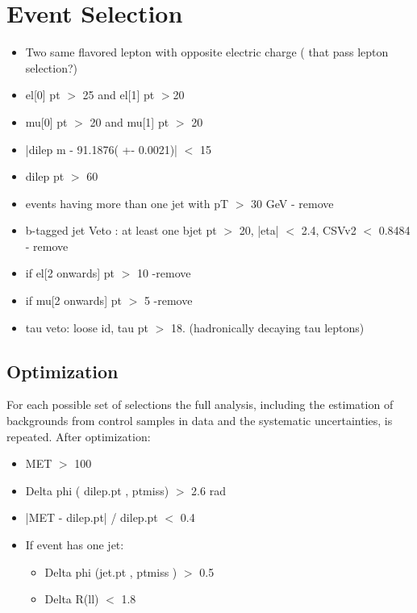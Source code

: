 \documentclass[12pt,A4paper]{article}
\begin{document}
\section{Event Selection}

\begin{itemize}
\item
    Two same flavored lepton with opposite electric charge ( that pass lepton selection?)
\item
    el[0] pt $>$ 25 and el[1] pt $>$20
\item
    mu[0] pt $>$ 20 and mu[1] pt $>$ 20
\item
    |dilep m - 91.1876( +- 0.0021)| $<$ 15
\item
    dilep pt $>$ 60 
\item
    events having more than one jet with pT $>$ 30 GeV - remove
\item
    b-tagged jet Veto : at least one bjet pt $>$ 20, |eta| $<$ 2.4, CSVv2 $<$ 0.8484 - remove
\item
    if el[2 onwards] pt $>$ 10 -remove
\item
    if mu[2 onwards] pt $>$ 5 -remove
\item
    tau veto: loose id, tau pt $>$ 18. (hadronically decaying tau leptons) 
\end{itemize}

\subsection{Optimization}

    For each possible set of selections the full analysis, including the estimation of backgrounds from control samples in data and the systematic uncertainties, is repeated. After optimization:

\begin{itemize}
\item
    MET $>$ 100
\item
    Delta phi ( dilep.pt , ptmiss) $>$ 2.6 rad
\item
    |MET - dilep.pt| / dilep.pt $<$ 0.4 
\item
If event has one jet:

\begin{itemize}
\item
    Delta phi (jet.pt , ptmiss ) $>$ 0.5
\item
    Delta R(ll) $<$ 1.8 
\end{itemize}
\end{itemize}
\end{document}

